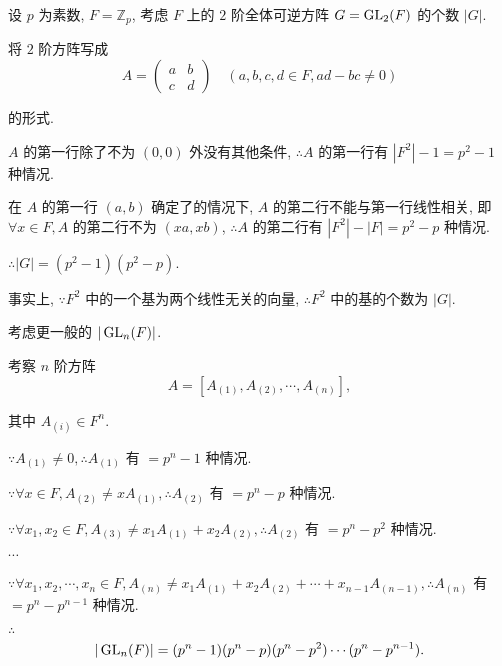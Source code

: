 \documentclass[color=black,device=normal,lang=cn,mode=geye]{elegantnote}
\begin{document}
\begin{example}
    设 $p$ 为素数, $F=\mathbb{Z}_p$, 考虑 $F$ 上的 $2$ 阶全体可逆方阵 $G=\operatorname{GL} _2(F)$ 的个数 $|G|$.

    将 $2$ 阶方阵写成
    \[A=\begin{pmatrix}
        a & b \\
        c & d
    \end{pmatrix}\quad(a,b,c,d\in F,ad-bc\neq0)\]

    的形式.

    $A$ 的第一行除了不为 $(0,0)$ 外没有其他条件, $\therefore A$ 的第一行有 $|F^2|-1=p^2-1$ 种情况.

    在 $A$ 的第一行 $(a,b)$ 确定了的情况下, $A$ 的第二行不能与第一行线性相关, 即 $\forall x\in F,A$ 的第二行不为 $(xa,xb)$, $\therefore A$ 的第二行有 $|F^2|-|F|=p^2-p$ 种情况.

    $\therefore|G|=(p^2-1)(p^2-p)$.

    事实上, $\because F^2$ 中的一个基为两个线性无关的向量, $\therefore F^2$ 中的基的个数为 $|G|$.

    考虑更一般的 $|\operatorname{GL} _n(F)|$.

    考察 $n$ 阶方阵
    \[A=[A_{(1)},A_{(2)},\cdots,A_{(n)}],\]

    其中 $A_{(i)}\in F^n$.

    $\because A_{(1)}\neq0,\therefore A_{(1)}$ 有 $=p^n-1$ 种情况.

    $\because\forall x\in F,A_{(2)}\neq xA_{(1)},\therefore A_{(2)}$ 有 $=p^n-p$ 种情况.

    $\because\forall x_1,x_2\in F,A_{(3)}\neq x_1A_{(1)}+x_2A_{(2)},\therefore A_{(2)}$ 有 $=p^n-p^2$ 种情况.

    $\cdots$

    $\because\forall x_1,x_2,\cdots,x_n\in F,A_{(n)}\neq x_1A_{(1)}+x_2A_{(2)}+\cdots+x_{n-1}A_{(n-1)},\therefore A_{(n)}$ 有 $=p^n-p^{n-1}$ 种情况.

    $\therefore$
    \[|\operatorname{GL} _n(F)|=(p^n-1)(p^n-p)(p^n-p^2)\cdots(p^n-p^{n-1}).\]
\end{example}
\end{document}
